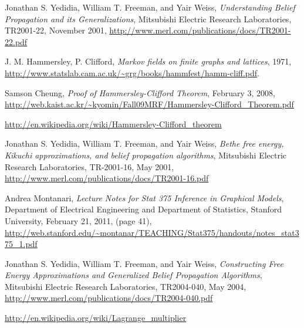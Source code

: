 \documentclass[fleqn,leqno]{article}
\begin{document}
\begin{thebibliography}{20}

  Jonathan S. Yedidia, William T. Freeman, and Yair Weiss,
  \emph{Understanding Belief Propagation and its Generalizations},
  Mitsubishi Electric Research Laboratories,
  TR2001-22, 
  November 2001,
  \url{http://www.merl.com/publications/docs/TR2001-22.pdf}

  J. M. Hammersley, P. Clifford,
  \emph{Markov fields on finite graphs and lattices},
  1971,
  \url{http://www.statslab.cam.ac.uk/~grg/books/hammfest/hamm-cliff.pdf}.

  Samson Cheung,
  \emph{Proof of Hammersley-Clifford Theorem},
  February 3, 2008,
  \url{http://web.kaist.ac.kr/~kyomin/Fall09MRF/Hammersley-Clifford_Theorem.pdf}

  \url{http://en.wikipedia.org/wiki/Hammersley-Clifford_theorem}
  
  Jonathan S. Yedidia, William T. Freeman, and Yair Weiss,
  \emph{Bethe free energy, Kikuchi approximations, and belief propagation algorithms},
  Mitsubishi Electric Research Laboratories,
  TR-2001-16,
  May 2001,
  \url{http://www.merl.com/publications/docs/TR2001-16.pdf}
  
  Andrea Montanari,
  \emph{Lecture Notes for Stat 375 Inference in Graphical Models},
  Department of Electrical Engineering and Department of Statistics, Stanford University,
  February 21, 2011,
  (page 41),
  \url{http://web.stanford.edu/~montanar/TEACHING/Stat375/handouts/notes_stat375_1.pdf}
  
  Jonathan S. Yedidia, William T. Freeman, and Yair Weiss,
  \emph{Constructing Free Energy Approximations and Generalized Belief Propagation Algorithms},
  Mitsubishi Electric Research Laboratories,
  TR2004-040,
  May 2004,
  \url{http://www.merl.com/publications/docs/TR2004-040.pdf}
  
  \url{http://en.wikipedia.org/wiki/Lagrange_multiplier}
  
\end{thebibliography}
\end{document}
